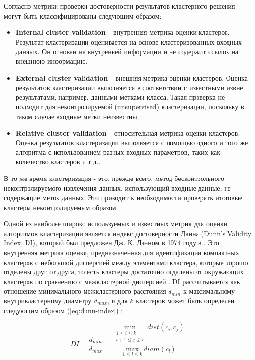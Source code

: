 Согласно \cite{online:dunn_cl_valid} метрики проверки достоверности результатов кластерного решения могут быть классифицированы следующим образом:
\begin{itemize}
	\item \textbf{Internal cluster validation} -- внутренняя метрика оценки кластеров. Результат кластеризации оценивается на основе кластеризованных входных данных. Он основан на внутренней информации и не содержит ссылок на внешнюю информацию.
	\item \textbf{External cluster validation} -- внешняя метрика оценки кластеров. Оценка результатов кластеризации выполняется в соответствии с известными извне результатами, например, данными метками класса. Такая проверка не подходит для неконтролируемой (unsupervised) кластеризации, поскольку в таком случае входные метки неизвестны.
	\item \textbf{Relative cluster validation} -- относительная метрика оценки кластеров. Оценка результатов кластеризации выполняется с помощью одного и того же алгоритма с использованием разных входных параметров, таких как количество кластеров и т.д..
\end{itemize}

В то же время кластеризация - это, прежде всего, метод бесконтрольного неконтролируемого извлечения данных, использующий входные данные, не содержащие меток данных. Это приводит к необходимости проверять итоговые кластеры неконтролируемым образом.

Одной из наиболее широко используемых и известных метрик для оценки алгоритмов кластеризации является индекс достоверности Данна (Dunn's Validity Index, DI), который был предложен Дж. К. Данном в 1974 году в \cite{article:dunn_orig}. Это внутренняя метрика оценки, предназначенная для идентификации компактных кластеров с небольшой дисперсией между элементами кластера, которые хорошо отделены друг от друга, то есть кластеры достаточно отдалены от окружающих кластеров по сравнению с межкластерной дисперсией \cite{online:hier_clust_r}. DI рассчитывается как отношение минимального межкластерного расстояния $d_{min}$ к максимальному внутрикластерному диаметру $d_{max}$, и для $k$ кластеров может быть определен следующим образом (\ref{eq:dunn-index}) \cite{article:quant_eval_perf_clust}:

\begin{equation} \label{eq:dunn-index}
	DI = \frac {d_{min}} {d_{max}} = \frac{\min\limits_{\substack{1 \leq i \leq k \\ i+1 \leq j \leq k}} dist(c_i, c_j)} {\max\limits_{1 \leq l \leq k} diam(c_l)}
\end{equation}

